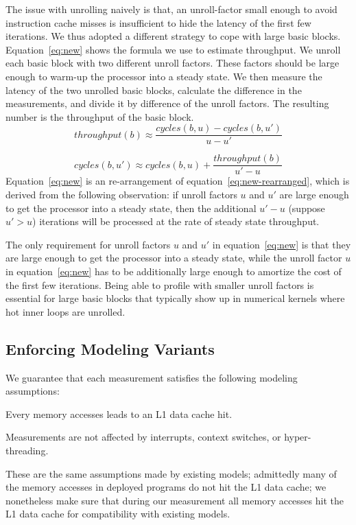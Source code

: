 The issue with unrolling naively is that,
an unroll-factor small enough to 
avoid instruction cache misses is 
insufficient to hide the latency of the first few iterations.
We thus adopted a different strategy to cope with large basic blocks.
Equation~\ref{eq:new} shows the formula we use to estimate throughput.
We unroll each basic block with two different unroll factors.
These factors should be large enough 
to warm-up the processor into a steady state.
We then measure the latency of the two unrolled basic blocks,
calculate the difference in the measurements, and divide it 
by difference of the unroll factors.
The resulting number is the throughput of the basic block.
\begin{equation}
\mathit{throughput}(b) \approx 
\frac{\mathit{cycles}(b, u) - \mathit{cycles}(b, u')}{u-u'}
\label{eq:new}
\end{equation}

\begin{equation}
\mathit{cycles}(b, u') \approx 
\mathit{cycles}(b, u) + \frac{\mathit{throughput(b)}}{u'-u}
\label{eq:new-rearranged}
\end{equation}
Equation~\ref{eq:new} is an re-arrangement of equation~\ref{eq:new-rearranged},
which is derived from the following observation:
if unroll factors $u$ and $u'$ are large enough
to get the processor into a steady state,
then the additional $u'-u$ (suppose $u' > u$) iterations will be processed at 
the rate of steady state throughput.

The only requirement for unroll factors $u$ and $u'$ in equation~\ref{eq:new}
is that they are large enough to get the processor into a steady state,
while the unroll factor $u$ in equation~\ref{eq:new} has to be additionally
large enough to amortize the cost of the first few iterations.
Being able to profile with smaller unroll factors is essential
for large basic blocks that typically show up in numerical kernels where
hot inner loops are unrolled.

\subsection{Enforcing Modeling Variants}\label{sec:invariants}
We guarantee that each measurement satisfies the following modeling assumptions:
\begin{enumerate*}
    \item Every memory accesses leads to an L1 data cache hit. 
    \item Measurements are not affected by interrupts, context switches,
    or hyper-threading.
\end{enumerate*}
These are the same assumptions made by existing models;
admittedly many of the memory accesses in deployed programs do not hit the L1 data cache;
we nonetheless make sure that during our measurement all memory accesses hit the L1 data cache for compatibility with existing models.

